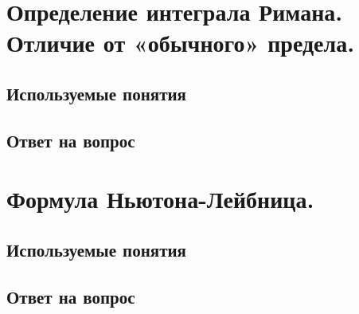 \documentclass[12pt,a4paper]{article}
\begin{document}
\newpage
\section{Определение интеграла Римана. Отличие от «обычного» предела.}

\subsection{Используемые понятия}


\subsection{Ответ на вопрос}


\newpage
\section{Формула Ньютона-Лейбница.}

\subsection{Используемые понятия}


\subsection{Ответ на вопрос}

\end{document}

